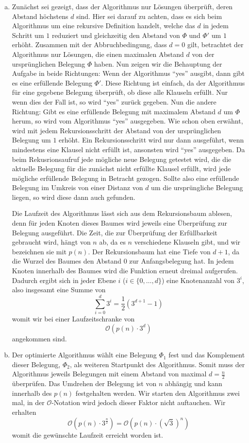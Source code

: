\documentclass[12pt,a4paper]{article}
\begin{document}
\begin{enumerate}[a)] 
	\item Zunächst sei gezeigt, dass der Algorithmus nur Lösungen überprüft, deren Abstand höchstens $d$ sind. Hier sei darauf zu achten, dass es sich beim Algorithmus um eine rekursive Definition handelt, welche das $d$ in jedem Schritt um $1$ reduziert und gleichzeitig den Abstand von $\Phi$ und $\Phi'$ um $1$ erhöht. Zusammen mit der Abbruchbedingung, dass $d=0$ gilt, betrachtet der Algorithmus nur Lösungen, die einen maximalen Abstand $d$ von der ursprünglichen Belegung $\Phi$ haben. Nun zeigen wir die Behauptung der Aufgabe in beide Richtungen: Wenn der Algorithmus "`yes"' ausgibt, dann gibt es eine erfüllende Belegung $\Phi'$. Diese Richtung ist einfach, da der Algorithmus für eine gegebene Belegung überprüft, ob diese alle Klauseln erfüllt. Nur wenn dies der Fall ist, so wird "`yes"' zurück gegeben. Nun die andere Richtung: Gibt es eine erfüllende Belegung mit maximalem Abstand $d$ um $\Phi$ herum, so wird vom Algorithmus "`yes"' ausgegeben. Wie schon oben erwähnt, wird mit jedem Rekursionsschritt der Abstand von der ursprünglichen Belegung um $1$ erhöht. Ein Rekursionsschritt wird nur dann ausgeführt, wenn mindestens eine Klausel nicht erfüllt ist, ansonsten wird "`yes"' ausgegeben. Da beim Rekusrionsaufruf jede mögliche neue Belegung getestet wird, die die aktuelle Belegung für die zunächst nicht erfüllte Klausel erfüllt, wird jede mögliche erfüllende Belegung in Betracht gezogen. Sollte also eine erfüllende Belegung im Umkreis von einer Distanz von $d$ um die ursprüngliche Belegung liegen, so wird diese dann auch gefunden.
		
		Die Laufzeit des Algorithmus lässt sich aus dem Rekursionsbaum ablesen, denn für jeden Knoten dieses Baumes wird jeweils eine Überprüfung zur Belegung ausgeführt. Die Zeit, die zur Überprüfung der Erfüllbarkeit gebraucht wird, hängt von $n$ ab, da es $n$ verschiedene Klauseln gibt, und wir bezeichnen sie mit $p(n)$. Der Rekursionsbaum hat eine Tiefe von $d+1$, da die Wurzel des Baumes den Abstand $0$ zur Anfangsbelegung hat. In jedem Knoten innerhalb des Baumes wird die Funktion erneut dreimal aufgerufen. Dadurch ergibt sich in jeder Ebene $i$ ($i \in \{0,\dots,d\}$) eine Knotenanzahl von $3^i$, also insgesamt eine Summe von
		$$\sum_{i=0}^d 3^i = \frac{1}{2}(3^{d+1} - 1)$$
		womit wir bei einer Laufzeitschranke von
		$$\mathcal{O}(p(n) \cdot 3^{d})$$
		angekommen sind.
		
		\item Der optimierte Algorithmus wählt eine Belegung $\Phi_1$ fest und das Komplement dieser Belegung, $\Phi_2$, als weiteren Startpunkt des Algorithmus. Somit muss der Algorithmus jeweils Belegungen mit einem Abstand von maximal $d = \frac{n}{2}$ überprüfen. Das Umdrehen der Belegung ist von $n$ abhängig und kann innerhalb des $p(n)$ festgehalten werden. Wir starten den Algorithmus zwei mal, in der $\mathcal{O}$-Notation wird jedoch dieser Faktor nicht auftauchen. Wir erhalten
			$$\mathcal{O}(p(n) \cdot 3^\frac{n}{2}) = \mathcal{O}(p(n) \cdot (\sqrt{3})^{n})$$
			womit die gewünschte Laufzeit erreicht worden ist.
\end{enumerate} 
\end{document}
